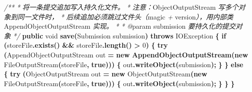 \documentclass[
  11pt,
]{ctexart}
\newenvironment{Shaded}{\begin{snugshade}}{\end{snugshade}}
\newcommand{\BuiltInTok}[1]{#1}
\newcommand{\CommentTok}[1]{\textcolor[rgb]{0.56,0.35,0.01}{\textit{#1}}}
\newcommand{\ControlFlowTok}[1]{\textcolor[rgb]{0.13,0.29,0.53}{\textbf{#1}}}
\newcommand{\DataTypeTok}[1]{\textcolor[rgb]{0.13,0.29,0.53}{#1}}
\newcommand{\DecValTok}[1]{\textcolor[rgb]{0.00,0.00,0.81}{#1}}
\newcommand{\FunctionTok}[1]{\textcolor[rgb]{0.13,0.29,0.53}{\textbf{#1}}}
\newcommand{\KeywordTok}[1]{\textcolor[rgb]{0.13,0.29,0.53}{\textbf{#1}}}
\newcommand{\NormalTok}[1]{#1}
\newcommand{\OperatorTok}[1]{\textcolor[rgb]{0.81,0.36,0.00}{\textbf{#1}}}
\begin{document}
\begin{Shaded}
\begin{Highlighting}[]
    \CommentTok{/**}
     \CommentTok{*} \CommentTok{将一条提交追加写入持久化文件。}
     \CommentTok{*} \CommentTok{注意：}\NormalTok{ObjectOutputStream }\CommentTok{写多个对象到同一文件时，}
     \CommentTok{*} \CommentTok{后续追加必须跳过文件头（}\NormalTok{magic }\CommentTok{+}\NormalTok{ version}\CommentTok{），用内部类}\NormalTok{ AppendObjectOutputStream }\CommentTok{实现。}
     \CommentTok{*}
\CommentTok{     * @}\NormalTok{param submission }\CommentTok{要持久化的提交对象}
     \CommentTok{*/}
    \KeywordTok{public} \DataTypeTok{void} \FunctionTok{save}\OperatorTok{(}\NormalTok{Submission submission}\OperatorTok{)} \KeywordTok{throws} \BuiltInTok{IOException} \OperatorTok{\{}
        \ControlFlowTok{if} \OperatorTok{(}\NormalTok{storeFile}\OperatorTok{.}\FunctionTok{exists}\OperatorTok{()} \OperatorTok{\&\&}\NormalTok{ storeFile}\OperatorTok{.}\FunctionTok{length}\OperatorTok{()} \OperatorTok{\textgreater{}} \DecValTok{0}\OperatorTok{)} \OperatorTok{\{}
            \ControlFlowTok{try} \OperatorTok{(}\NormalTok{AppendObjectOutputStream out }\OperatorTok{=}
                     \KeywordTok{new} \FunctionTok{AppendObjectOutputStream}\OperatorTok{(}\KeywordTok{new} \BuiltInTok{FileOutputStream}\OperatorTok{(}\NormalTok{storeFile}\OperatorTok{,} \KeywordTok{true}\OperatorTok{)))} \OperatorTok{\{}
\NormalTok{                out}\OperatorTok{.}\FunctionTok{writeObject}\OperatorTok{(}\NormalTok{submission}\OperatorTok{);}
            \OperatorTok{\}}
        \OperatorTok{\}} \ControlFlowTok{else} \OperatorTok{\{}
            \ControlFlowTok{try} \OperatorTok{(}\BuiltInTok{ObjectOutputStream}\NormalTok{ out }\OperatorTok{=}
                     \KeywordTok{new} \BuiltInTok{ObjectOutputStream}\OperatorTok{(}\KeywordTok{new} \BuiltInTok{FileOutputStream}\OperatorTok{(}\NormalTok{storeFile}\OperatorTok{,} \KeywordTok{true}\OperatorTok{)))} \OperatorTok{\{}
\NormalTok{                out}\OperatorTok{.}\FunctionTok{writeObject}\OperatorTok{(}\NormalTok{submission}\OperatorTok{);}
            \OperatorTok{\}}
        \OperatorTok{\}}
    \OperatorTok{\}}


\end{Highlighting}
\end{Shaded}
\end{document}
